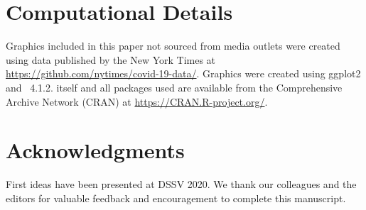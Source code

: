 \documentclass[article]{jdssv}\usepackage[]{graphicx}\usepackage[]{xcolor} %
\providecommand{\DIFdelbegin}{} %
\providecommand{\DIFdelend}{} %
\newcommand{\DIFscaledelfig}{0.5}
\newlength{\DIFdelgraphicswidth} %
\newlength{\DIFdelgraphicsheight} %
\newcommand{\DIFdelincludegraphics}[2][]{%
\sbox{\DIFdelgraphicsbox}{\DIFOincludegraphics[#1]{#2}}%
\settoboxwidth{\DIFdelgraphicswidth}{\DIFdelgraphicsbox} %
\settoboxtotalheight{\DIFdelgraphicsheight}{\DIFdelgraphicsbox} %
\scalebox{\DIFscaledelfig}{%
\parbox[b]{\DIFdelgraphicswidth}{\usebox{\DIFdelgraphicsbox}\\[-\baselineskip] \rule{\DIFdelgraphicswidth}{0em}}\llap{\resizebox{\DIFdelgraphicswidth}{\DIFdelgraphicsheight}{%
\setlength{\unitlength}{\DIFdelgraphicswidth}%
\begin{picture}(1,1)%
\thicklines\linethickness{2pt} %
{\color[rgb]{1,0,0}\put(0,0){\framebox(1,1){}}}%
{\color[rgb]{1,0,0}\put(0,0){\line( 1,1){1}}}%
{\color[rgb]{1,0,0}\put(0,1){\line(1,-1){1}}}%
\end{picture}%
}\hspace*{3pt}}} %
} %
\DeclareRobustCommand{\DIFdelbegin}{\DIFOdelbegin \let\includegraphics\DIFdelincludegraphics} %
\DeclareRobustCommand{\DIFdelend}{\DIFOaddend \let\includegraphics\DIFOincludegraphics} %
\begin{document}

\newpage
\section*{Computational Details}
Graphics included in this paper not sourced from media outlets were created using data published by the New York Times at \url{https://github.com/nytimes/covid-19-data/}. Graphics were created using ggplot2\citep{ggplot2} and ~4.1.2.  itself and all packages used are available from the Comprehensive  Archive Network (CRAN) at \url{https://CRAN.R-project.org/}.

\section*{Acknowledgments}

First ideas have been presented at DSSV 2020. We thank our colleagues and the editors for valuable feedback and encouragement to complete this manuscript.





\DIFdelbegin %

\DIFdelend %
% 
% 
% 
% 
\end{document}
